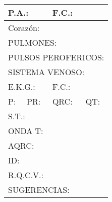 \documentclass[10pt,a4paper]{article}
\begin{document}
\begin{center}
{\begin{tabular}{|p{2.8cm}p{2.8cm}p{2.8cm}p{2.8cm}|}
\hline 
\multicolumn{2}{|l}{ \scriptsize{P.A.: } } & \multicolumn{2}{l|}{ \scriptsize{F.C.: }} \\
\hline
\multicolumn{4}{|l|}{\begin{minipage}[t]{12.5 cm}\scriptsize{Coraz\'on: }\end{minipage}}\\
\hline
\multicolumn{4}{|l|}{\begin{minipage}[t]{12.5 cm}\scriptsize{PULMONES: }\end{minipage}}\\
\hline
\multicolumn{4}{|l|}{\begin{minipage}[t]{12.5 cm}\scriptsize{PULSOS PEROFERICOS: }\end{minipage}}\\
\hline
\multicolumn{4}{|l|}{\begin{minipage}[t]{12.5 cm}\scriptsize{SISTEMA VENOSO: }\end{minipage}}\\
\hline
\multicolumn{2}{|l}{\begin{minipage}[t]{5.5 cm}\scriptsize{E.K.G.: }\end{minipage}}&\multicolumn{2}{l|}{\begin{minipage}[t]{5.5 cm}\scriptsize{F.C.: }\end{minipage}}\\
\hline
\scriptsize{P:}&\scriptsize{PR:}&\scriptsize{QRC:}&\scriptsize{QT:}\\
\hline 
\multicolumn{4}{|l|}{\begin{minipage}[t]{12.5 cm}\scriptsize{S.T.: }\end{minipage}}\\
\hline
\multicolumn{4}{|l|}{\begin{minipage}[t]{12.5 cm}\scriptsize{ONDA T: }\end{minipage}}\\
\hline
\multicolumn{4}{|l|}{\begin{minipage}[t]{12.5 cm}\scriptsize{AQRC: }\end{minipage}}\\
\hline 
\multicolumn{4}{|l|}{\begin{minipage}[t]{12.5 cm}\scriptsize{ID: }\end{minipage}}\\
\hline 
\multicolumn{4}{|l|}{\begin{minipage}[t]{12.5 cm}\scriptsize{R.Q.C.V.: }\end{minipage}}\\
\hline 
\multicolumn{4}{|l|}{\begin{minipage}[t]{12.5 cm}\scriptsize{SUGERENCIAS: }\end{minipage}}\\

\end{tabular}}
\end{center}
\end{document}
